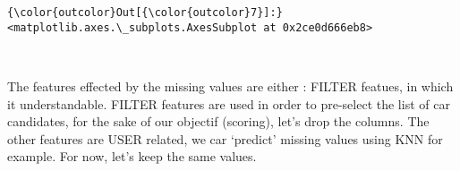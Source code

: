 \documentclass[11pt]{article}
\begin{document}
\begin{Verbatim}[commandchars=\\\{\}]
{\color{outcolor}Out[{\color{outcolor}7}]:} <matplotlib.axes.\_subplots.AxesSubplot at 0x2ce0d666eb8>
\end{Verbatim}
            
    \begin{center}
    \end{center}
    { \hspace*{\fill} \\}
    
    The features effected by the missing values are either : FILTER featues,
in which it understandable. FILTER features are used in order to
pre-select the list of car candidates, for the sake of our objectif
(scoring), let's drop the columns. The other features are USER related,
we car `predict' missing values using KNN for example. For now, let's
keep the same values.
\end{document}
